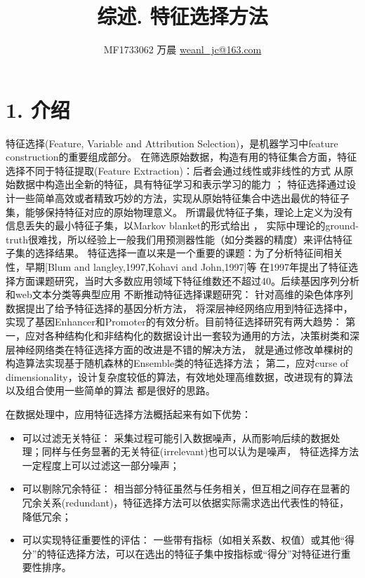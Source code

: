 \documentclass[a4paper,UTF8]{article}
\begin{document}


\title{综述. 特征选择方法}
\author{MF1733062 万晨 \url{weanl_jc@163.com}}
\maketitle

\section*{1. 介绍}
  特征选择(Feature, Variable and Attribution Selection)，是机器学习中feature construction的重要组成部分。
  在筛选原始数据，构造有用的特征集合方面，特征选择不同于特征提取(Feature Extraction)：后者会通过线性或非线性的方式
  从原始数据中构造出全新的特征，具有特征学习和表示学习的能力
  \cite{DBLP:journals/pami/BengioCV13}；
  特征选择通过设计一些简单高效或者精致巧妙的方法，实现从原始特征集合中选出最优的特征子集，能够保持特征对应的原始物理意义。
  所谓最优特征子集，理论上定义为没有信息丢失的最小特征子集，以Markov blanket的形式给出
  \cite{DBLP:conf/icml/KollerS96}
  \cite{DBLP:journals/jmlr/AliferisSTMK10}
  \cite{DBLP:journals/jmlr/AliferisSTMK10a}，
  实际中理论的ground-truth很难找，所以经验上一般我们用预测器性能（如分类器的精度）来评估特征子集的选择结果。
  特征选择一直以来是一个重要的课题：为了分析特征间相关性，早期[Blum and langley,1997,Kohavi and John,1997]等
  在1997年提出了特征选择方面课题研究，当时大多数应用领域下特征维数还不超过40。后续基因序列分析和web文本分类等典型应用
  不断推动特征选择课题研究：
  \cite{DBLP:conf/icml/XingJK01}
  针对高维的染色体序列数据提出了给予特征选择的基因分析方法，
  \cite{DBLP:conf/recomb/LiCW15}
  将深层神经网络应用到特征选择中，实现了基因Enhancer和Promoter的有效分析。目前特征选择研究有两大趋势：
  第一，应对各种结构化和非结构化的数据设计出一套较为通用的方法，决策树类和深层神经网络类在特征选择方面的改进是不错的解决方法，
  \cite{DBLP:conf/ijcnn/DengR12}
  就是通过修改单棵树的构造算法实现基于随机森林的Ensemble类的特征选择方法；
  第二，应对curse of dimensionality，设计复杂度较低的算法，有效地处理高维数据，改进现有的算法以及组合使用一些简单的算法
  都是很好的思路。

  在数据处理中，应用特征选择方法概括起来有如下优势：
  \begin{itemize}
    \item 可以过滤无关特征：
    采集过程可能引入数据噪声，从而影响后续的数据处理；同样与任务显著的无关特征(irrelevant)也可以认为是噪声，
    特征选择方法一定程度上可以过滤这一部分噪声；

    \item 可以剔除冗余特征：
    相当部分特征虽然与任务相关，但互相之间存在显著的冗余关系(redundant)，特征选择方法可以依据实际需求选出代表性的特征，
    降低冗余；

    \item 可以实现特征重要性的评估：
    一些带有指标（如相关系数、权值）或其他“得分”的特征选择方法，可以在选出的特征子集中按指标或“得分”对特征进行重要性排序。

  \end{itemize}
\end{document}
